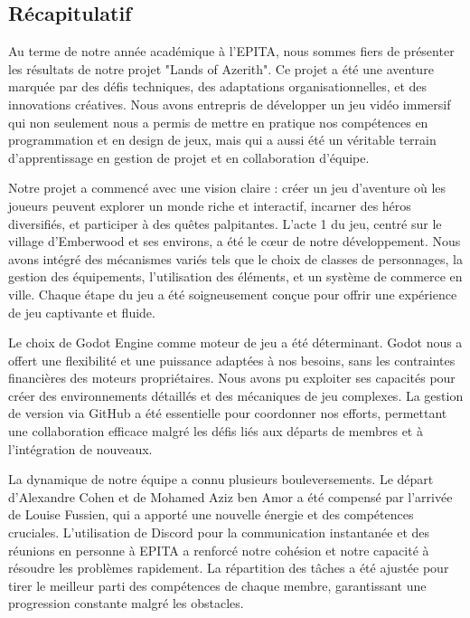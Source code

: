 \subsection{Récapitulatif}
Au terme de notre année académique à l'EPITA, nous sommes fiers de présenter les résultats de notre projet "Lands of Azerith". Ce projet a été une aventure marquée par des défis techniques, des adaptations organisationnelles, et des innovations créatives. Nous avons entrepris de développer un jeu vidéo immersif qui non seulement nous a permis de mettre en pratique nos compétences en programmation et en design de jeux, mais qui a aussi été un véritable terrain d'apprentissage en gestion de projet et en collaboration d'équipe. 

  

Notre projet a commencé avec une vision claire : créer un jeu d'aventure où les joueurs peuvent explorer un monde riche et interactif, incarner des héros diversifiés, et participer à des quêtes palpitantes. L'acte 1 du jeu, centré sur le village d'Emberwood et ses environs, a été le cœur de notre développement. Nous avons intégré des mécanismes variés tels que le choix de classes de personnages, la gestion des équipements, l'utilisation des éléments, et un système de commerce en ville. Chaque étape du jeu a été soigneusement conçue pour offrir une expérience de jeu captivante et fluide. 

  

Le choix de Godot Engine comme moteur de jeu a été déterminant. Godot nous a offert une flexibilité et une puissance adaptées à nos besoins, sans les contraintes financières des moteurs propriétaires. Nous avons pu exploiter ses capacités pour créer des environnements détaillés et des mécaniques de jeu complexes. La gestion de version via GitHub a été essentielle pour coordonner nos efforts, permettant une collaboration efficace malgré les défis liés aux départs de membres et à l'intégration de nouveaux. 

  

La dynamique de notre équipe a connu plusieurs bouleversements. Le départ d'Alexandre Cohen et de Mohamed Aziz ben Amor a été compensé par l'arrivée de Louise Fussien, qui a apporté une nouvelle énergie et des compétences cruciales. L'utilisation de Discord pour la communication instantanée et des réunions en personne à EPITA a renforcé notre cohésion et notre capacité à résoudre les problèmes rapidement. La répartition des tâches a été ajustée pour tirer le meilleur parti des compétences de chaque membre, garantissant une progression constante malgré les obstacles. 

